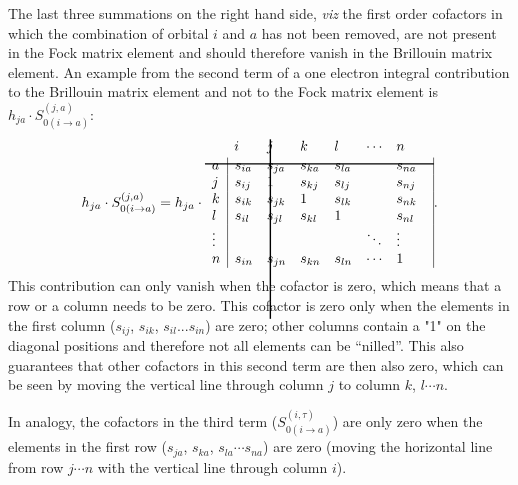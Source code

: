The last three summations on the right hand side, \textit{viz} the first order cofactors in which the combination of orbital $i$ and $a$ has not been removed, are not present in the Fock matrix element and should therefore vanish in the Brillouin matrix element. An example from the second term of a one electron integral contribution to the Brillouin matrix element and not to the Fock matrix element is $h_{ja} \cdot S_{0(i\rightarrow a)}^{(j,a)}$:
\begin{equation}
h_{ja}\cdot S_{0(i\rightarrow a)}^{(j,a)} = h_{ja} \cdot
\begin{array}{lllllll}
 & i & \hskip 2.0 pt \hbox{\lower 120pt\hbox{\vrule height128pt width 1.0pt}}\hskip-3.0 pt j & k & l & \cdots & n \\
\noalign{\vskip-115pt}
 a &  \multicolumn{1}{|l}{ s_{ia} } & s_{ja} & s_{ka} & s_{la} & & \multicolumn{1}{l|}{ s_{na} } \\
\noalign{\vskip-8pt}
\multispan7\hbox{\vrule  height 1.0 pt width164pt}\cr
\noalign{\vskip 7pt}
 j & \multicolumn{1}{|l}{ s_{ij}} & 1 & s_{kj} & s_{lj} & & \multicolumn{1}{l|}{s_{nj}} \\
 k & \multicolumn{1}{|l}{ s_{ik}} & s_{jk} & 1 & s_{lk} & & \multicolumn{1}{l|}{s_{nk}} \\
 l & \multicolumn{1}{|l}{ s_{il}} & s_{jl} & s_{kl} & 1 & & \multicolumn{1}{l|}{s_{nl}} \\
 \vdots & \multicolumn{1}{|l}{ } &   &   & & \ddots & \multicolumn{1}{l|}{\vdots} \\
 n & \multicolumn{1}{|l}{ s_{in}} & s_{jn} & s_{kn} & s_{ln} & \cdots & \multicolumn{1}{l|}{1}
\end{array}.\\
\label{ch2.eq.case2}
\end{equation}
This contribution can only vanish when the cofactor is zero, which means that a row or a column needs to be zero. This cofactor is zero only when the elements in the first column ($s_{ij}$, $s_{ik}$, $s_{il} ... s_{in}$) are zero; other columns contain a "1" on the diagonal positions and therefore not all elements can be ``nilled''. This also guarantees that other cofactors in this second term are then also zero, which can be seen by moving the vertical line through column $j$ to column $k$, $l \cdots n$. 

In analogy, the cofactors in the third term ($S_{0(i\rightarrow a)}^{(i,\tau)}$) are only zero when the elements in the first row ($s_{ja}$, $s_{ka}$, $s_{la} \cdots s_{na}$) are zero (moving the horizontal line from row $j \cdots n$ with the vertical line through column $i$). 

